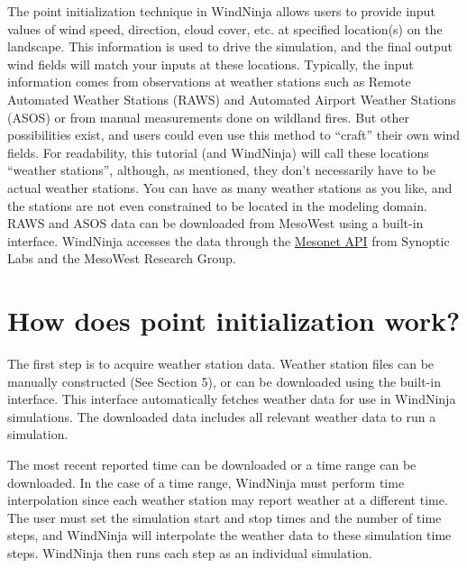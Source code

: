\documentclass[12pt]{article}
\begin{document}
The point initialization technique in WindNinja allows users to provide input values of wind speed, direction, cloud cover, etc. at specified location(s) on the landscape.  This information is used to drive the simulation, and the final output wind fields will match your inputs at these locations.  Typically, the input information comes from observations at weather stations such as Remote Automated Weather Stations (RAWS) and Automated Airport Weather Stations (ASOS) or from manual measurements done on wildland fires.  But other possibilities exist, and users could even use this method to “craft” their own wind fields.  For readability, this tutorial (and WindNinja) will call these locations “weather stations”, although, as mentioned, they don't necessarily have to be actual weather stations.  You can have as many weather stations as you like, and the stations are not even constrained to be located in the modeling domain. RAWS and ASOS data can be downloaded from MesoWest using a built-in interface.  WindNinja accesses the data through the \href{https://synopticlabs.org/api/mesonet/}{Mesonet API} from Synoptic Labs and the MesoWest Research Group.

\section*{How does point initialization work?}

The first step is to acquire weather station data. Weather station files can be manually constructed (See Section 5), or can be downloaded using the built-in interface. This interface automatically fetches weather data for use in WindNinja simulations. The downloaded data includes all relevant weather data to run a simulation. 

The most recent reported time can be downloaded or a time range can be downloaded.  In the case of a time range, WindNinja must perform time interpolation since each weather station may report weather at a different time.  The user must set the simulation start and stop times and the number of time steps, and WindNinja will interpolate the weather data to these simulation time steps.  WindNinja then runs each step as an individual simulation.
\end{document}
